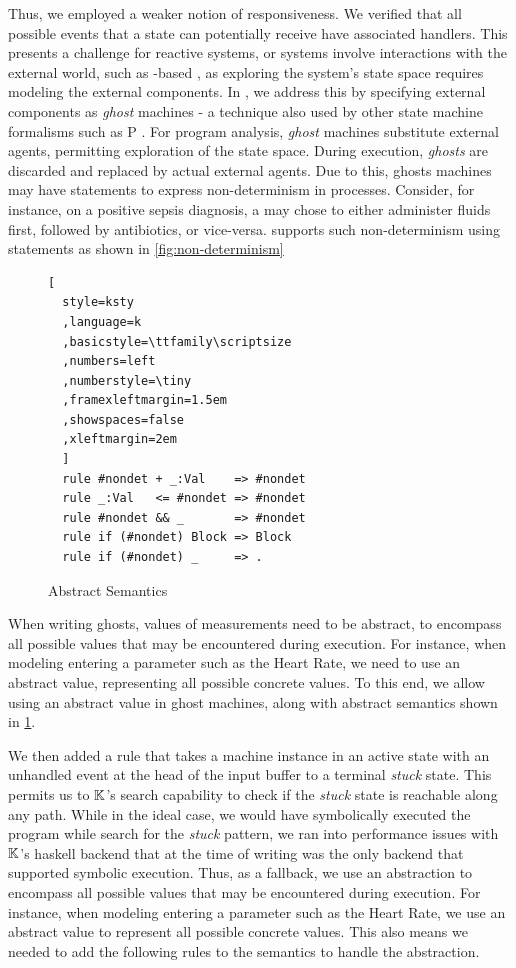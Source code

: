 Thus, we employed a weaker notion of responsiveness. We verified that all
possible events that a state can potentially receive have associated handlers.
 This presents a challenge for reactive systems, or systems involve interactions
with the external world, such as \MediK{}-based \CDSSs, as exploring
the system's state space requires modeling the external components.
In \MediK{}, we address this by specifying external components
as \emph{ghost} machines - a technique also used by other state machine
formalisms such as P \cite{DesaiPLDI13}.
For program analysis, \emph{ghost} machines substitute external agents,
permitting exploration of the state space.
During execution, \emph{ghosts} are discarded and replaced by actual external agents.
Due to this, ghosts machines may have statements to express non-determinism
in processes. Consider, for instance, on a positive sepsis diagnosis, a
\HCP{} may chose to either administer fluids first, followed by antibiotics, or
vice-versa. \MediK{} supports such non-determinism using 
statements as shown in \figurename{} \ref{fig:non-determinism}

\begin{figure}
\begin{lstlisting}[
  style=ksty
  ,language=k
  ,basicstyle=\ttfamily\scriptsize
  ,numbers=left
  ,numberstyle=\tiny
  ,framexleftmargin=1.5em
  ,showspaces=false
  ,xleftmargin=2em
  ]
  rule #nondet + _:Val    => #nondet
  rule _:Val   <= #nondet => #nondet
  rule #nondet && _       => #nondet
  rule if (#nondet) Block => Block
  rule if (#nondet) _     => .
\end{lstlisting}
  \caption{Abstract Semantics}\label{fig:abstract-semantics}
\end{figure}

When writing ghosts, values of measurements need to be abstract, to
encompass all possible values that may be encountered during execution.
For instance, when modeling entering a parameter such as the Heart Rate,
we need to use an abstract value, representing all possible concrete values.
To this end, we allow using an abstract value  in ghost machines,
along with abstract semantics shown in \figurename{} \ref{fig:abstract-semantics}.

We then added a rule that takes a machine instance in an active state
with an unhandled event at the head of the input buffer to a terminal \emph{stuck}
state. This permits us to $\mathbb{K}$'s search capability to check if the \emph{stuck}
state is reachable along any path.
While in the ideal case, we would have symbolically executed the program while
search for the \emph{stuck} pattern, we ran into performance issues
with $\mathbb{K}$'s haskell backend that at the time of writing was the only backend
that supported symbolic execution. Thus, as a fallback, we
use an abstraction to
encompass all possible values that may be encountered during execution.
For instance, when modeling entering a parameter such as the Heart Rate,
we use an abstract value to represent all possible concrete values.
This also means we needed to add the following rules to the semantics to
handle the abstraction.


